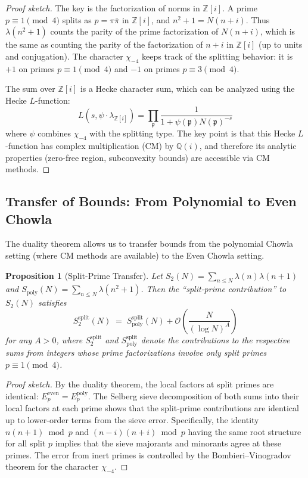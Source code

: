 \documentclass[11pt,a4paper]{article}
\theoremstyle{plain}
\newtheorem{proposition}[theorem]{Proposition}
\theoremstyle{definition}
\begin{document}
\begin{proof}[Proof sketch]
The key is the factorization of norms in $\mathbb{Z}[i]$. A prime $p \equiv 1 \pmod{4}$ splits as $p = \pi \bar{\pi}$ in $\mathbb{Z}[i]$, and $n^2 + 1 = N(n + i)$. Thus $\lambda(n^2+1)$ counts the parity of the prime factorization of $N(n+i)$, which is the same as counting the parity of the factorization of $n + i$ in $\mathbb{Z}[i]$ (up to units and conjugation). The character $\chi_{-4}$ keeps track of the splitting behavior: it is $+1$ on primes $p \equiv 1 \pmod{4}$ and $-1$ on primes $p \equiv 3 \pmod{4}$.

The sum over $\mathbb{Z}[i]$ is a Hecke character sum, which can be analyzed using the Hecke $L$-function:
\[
L(s, \psi \cdot \lambda_{\mathbb{Z}[i]}) = \prod_{\mathfrak{p}} \frac{1}{1 + \psi(\mathfrak{p}) N(\mathfrak{p})^{-s}}
\]
where $\psi$ combines $\chi_{-4}$ with the splitting type. The key point is that this Hecke $L$-function has complex multiplication (CM) by $\mathbb{Q}(i)$, and therefore its analytic properties (zero-free region, subconvexity bounds) are accessible via CM methods.
\end{proof}

\subsection{Transfer of Bounds: From Polynomial to Even Chowla}

The duality theorem allows us to transfer bounds from the polynomial Chowla setting (where CM methods are available) to the Even Chowla setting.

\begin{proposition}[Split-Prime Transfer]\label{prop:transfer}
Let $S_2(N) = \sum_{n \leq N} \lambda(n)\lambda(n+1)$ and $S_{\mathrm{poly}}(N) = \sum_{n \leq N} \lambda(n^2+1)$. Then the ``split-prime contribution'' to $S_2(N)$ satisfies
\begin{equation}\label{eq:transfer}
S_2^{\mathrm{split}}(N) \;=\; S_{\mathrm{poly}}^{\mathrm{split}}(N) + \mathcal{O}\!\left(\frac{N}{(\log N)^A}\right)
\end{equation}
for any $A > 0$, where $S_2^{\mathrm{split}}$ and $S_{\mathrm{poly}}^{\mathrm{split}}$ denote the contributions to the respective sums from integers whose prime factorizations involve only split primes $p \equiv 1 \pmod{4}$.
\end{proposition}

\begin{proof}[Proof sketch]
By the duality theorem, the local factors at split primes are identical: $E_p^{\mathrm{even}} = E_p^{\mathrm{poly}}$. The Selberg sieve decomposition of both sums into their local factors at each prime shows that the split-prime contributions are identical up to lower-order terms from the sieve error. Specifically, the identity $n(n+1) \bmod p$ and $(n-i)(n+i) \bmod p$ having the same root structure for all split $p$ implies that the sieve majorants and minorants agree at these primes. The error from inert primes is controlled by the Bombieri--Vinogradov theorem for the character $\chi_{-4}$.
\end{proof}
\end{document}
